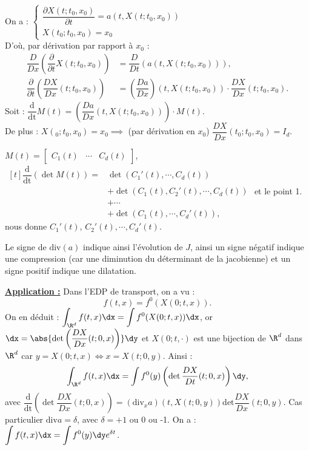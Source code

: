 \documentclass[12pt,a4paper]{article}
\newcommand\diff[2]{\dfrac{\partial #1}{\partial #2}}
\newcommand\deriv[2]{\dfrac{\mathrm{d}#1}{\mathrm{d#2}}}
\begin{document}
	\begin{dem}
		$ $\\
		\begin{enumerate}
			\begin{minipage}[t]{17.5cm}
				
				\item On a : $\begin{cases}
					\diff{X(t;t_0,x_0)}{t} = a(t,X(t;t_0,x_0))\\
					X(t_0;t_0,x_0) = x_0
				\end{cases}$\\
				D'où, par dérivation par rapport à $x_0$ :
				\[
				\begin{aligned}
					\dfrac{D}{Dx}\left(\diff{}t X(t;t_0,x_0)\right) &= \dfrac{D}{Dt}\left(a(t,X(t;t_0,x_0))\right),\\
					\diff{}t\left(\dfrac{DX}{Dx}(t;t_0,x_0)\right)&= \left(\dfrac{D a}{Dx}\right)(t,X(t;t_0,x_0))\cdot\dfrac{DX}{Dx}(t;t_0,x_0).
				\end{aligned}
				\]
				Soit : $\deriv{}{t} M(t) = \left(\dfrac{Da}{Dx}(t,X(t;t_0,x_0))\right)\cdot M(t)$.\\ De plus : $X(_0;t_0,x_0) = x_0 \implies$ (par dérivation en $x_0$) $\dfrac{DX}{Dx}(t_0;t_0,x_0) = I_d$.
				
				\item $M(t) = \begin{bmatrix}
					C_1(t) & \cdots & C_d(t)
				\end{bmatrix}$, $\begin{aligned}[t]
					\deriv{}t\left(\det M(t)\right) =& \det(C_1'(t),\cdots,C_d(t))\\
					&+\det(C_1(t),C_2'(t),\cdots,C_d(t))\\
					&+\cdots\\
					&+\det(C_1(t),\cdots,C_d'(t)),
				\end{aligned}$ et le point 1. nous donne $C_1'(t),\, C_2'(t),\cdots,C_d'(t)$.
			\end{minipage}
		\end{enumerate}
	\end{dem}
	
	Le signe de $\mathrm{div}(a)$ indique ainsi l'évolution de $J$, ainsi un signe négatif indique une compression (car une diminution du déterminant de la jacobienne) et un signe positif indique une dilatation.
	
	\textbf{\underline{Application :}} Dans l'EDP de transport, on a vu :
	\[
	f(t,x) = f^0(X(0;t,x)).
	\]
	On en déduit : $\displaystyle\int_{\R^d} f(t,x)\dx = \int f^0(X(0;t,x))\dx$, or $\dx = \abs{\det\left( \dfrac{D X}{Dx}(t;0,x)\right)}\dy$ et $X(0;t,\cdot)$ est une bijection de $\R^d$ dans $\R^d$ car $y = X(0;t,x) \iff x = X(t;0,y)$. Ainsi :
	\begin{equation}
		\int_{\R^d} f(t,x)\dx = \int f^0(y) \left(\det \dfrac{DX}{Dt}(t;0,x)\right)\dy,
	\end{equation}
	avec $\deriv{}t \left(\det\dfrac{DX}{Dx}(t;0,x)\right) = \left(\mathrm{div}_x a\right)(t,X(t;0,y))\mathrm{det} \dfrac{DX}{Dx}(t;0,y)$. Cas particulier $\mathrm{div} a = \delta$, avec $\delta = +1$ ou 0 ou -1. On a : $\displaystyle\int f(t,x)\dx = \int f^0(y)\dy e^{\delta t}$.
	
\end{document}
